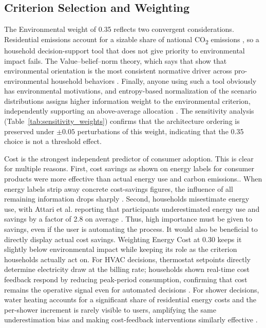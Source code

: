 \documentclass[final,3p,times]{elsarticle}
\begin{document}
\subsection{Criterion Selection and Weighting}

The Environmental weight of 0.35 reflects two convergent considerations. Residential emissions account for a sizable share of national CO\textsubscript{2} emissions \cite{dietz2009}, so a household decision-support tool that does not give priority to environmental impact fails. The Value--belief--norm theory, which says that  show that environmental orientation is the most consistent normative driver across pro-environmental household behaviors \cite{stern1999,fornara2016,hong2024,steg2005,lee2023,rezaei2020,wang2023,lind2015}. Finally, anyone using such a tool obviously has environmental motivations, and entropy-based normalization of the scenario distributions assigns higher information weight to the environmental criterion, independently supporting an above-average allocation \cite{roszkowska2026}. The sensitivity analysis (Table~\ref{tab:sensitivity_weights}) confirms that the architecture ordering is preserved under $\pm 0.05$ perturbations of this weight, indicating that the 0.35 choice is not a threshold effect.

Cost is the strongest independent predictor of consumer adoption. This is clear for multiple reasons. First, cost savings as shown on energy labels for consumer products were more effective than actual energy use and carbon emissions.\cite{newell2014}. When energy labels strip away concrete cost-savings figures, the influence of all remaining information drops sharply \cite{allcott2015,andor2020}. Second, households misestimate energy use, with Attari et al. reporting that participants underestimated energy use and savings by a factor of 2.8 on average \cite{attari2010}. Thus, high importance must be given to savings, even if the user is automating the process. It would also be beneficial to directly display actual cost savings. Weighting Energy Cost at 0.30 keeps it slightly below environmental impact while keeping its role as the criterion households actually act on. For HVAC decisions, thermostat setpoints directly determine electricity draw at the billing rate; households shown real-time cost feedback respond by reducing peak-period consumption, confirming that cost remains the operative signal even for automated decisions \cite{managementscience_pricing2023}. For shower decisions, water heating accounts for a significant share of residential energy costs and the per-shower increment is rarely visible to users, amplifying the same underestimation bias and making cost-feedback interventions similarly effective \cite{reu2016,harrispoll2024}.
\end{document}
